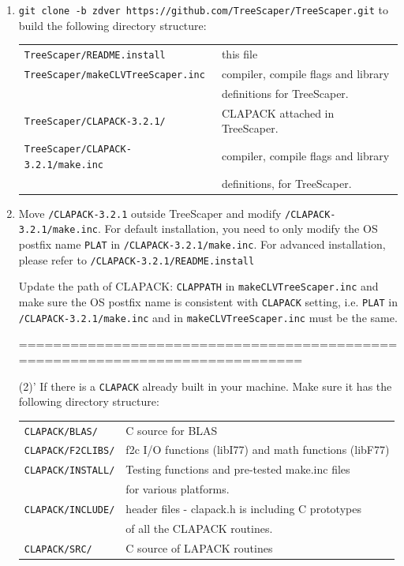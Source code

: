 \documentclass[11pt,a4paper]{article}
\theoremstyle{definition}
\theoremstyle{definition}
\numberwithin{equation}{section}
\begin{document}
	\begin{enumerate}[label = (\arabic*)]
		\item \texttt{git clone -b zdver https://github.com/TreeScaper/TreeScaper.git} to build 
		the following directory structure:
		
		\begin{table}[!h]
			\begin{tabular}{ll}
				\texttt{TreeScaper/README.install}           &this file\\

				\texttt{TreeScaper/makeCLVTreeScaper.inc}    &compiler, compile flags and library\\ 
				&definitions for TreeScaper.\\
				\texttt{TreeScaper/CLAPACK-3.2.1/}           &CLAPACK attached in TreeScaper.\\
				\texttt{TreeScaper/CLAPACK-3.2.1/make.inc}   &compiler, compile flags and library\\
				&definitions, for TreeScaper.\\
			\end{tabular}
		\end{table} 
		
		\item Move \texttt{/CLAPACK-3.2.1} outside TreeScaper and modify 
		\texttt{/CLAPACK-3.2.1/make.inc}.
		For default installation, you need to only modify the OS postfix name
		\texttt{PLAT} in \texttt{/CLAPACK-3.2.1/make.inc}.
		For advanced installation, please refer to \texttt{/CLAPACK-3.2.1/README.install}
		
		Update the path of CLAPACK:
		\texttt{CLAPPATH} in \texttt{makeCLVTreeScaper.inc}
		and make sure the OS postfix name is consistent with \texttt{CLAPACK} setting,
		i.e. \texttt{PLAT} in \texttt{/CLAPACK-3.2.1/make.inc} and in \texttt{makeCLVTreeScaper.inc}
		must be the same.
		
		=============================================================================
		
		(2)' If there is a \texttt{CLAPACK} already built in your machine. Make sure it has
		the following directory structure:
		
		\begin{table}[!h]
			\begin{tabular}{ll}
				\texttt{CLAPACK/BLAS/}       &C source for BLAS\\
				\texttt{CLAPACK/F2CLIBS/}    &f2c I/O functions (libI77) and math functions (libF77)\\
				\texttt{CLAPACK/INSTALL/}    &Testing functions and pre-tested make.inc files\\
				&for various platforms.\\
				\texttt{CLAPACK/INCLUDE/}    &header files - clapack.h is including C prototypes \\
				&of all the CLAPACK routines.\\
				\texttt{CLAPACK/SRC/}        &C source of LAPACK routines\\
			\end{tabular}
		\end{table} 
		

\end{enumerate}
\end{document}
